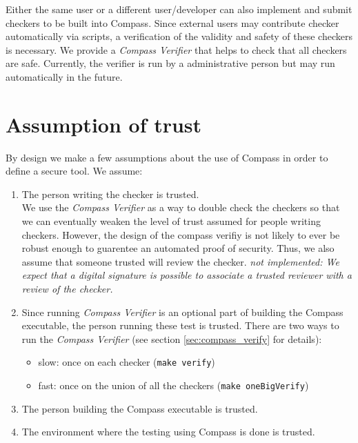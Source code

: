 Either the same user or a different user/developer can also
implement and submit checkers to be built into Compass.
Since external users may contribute checker automatically via scripts, a verification of the 
validity and safety of these checkers is necessary. We provide a \emph{Compass Verifier}
that helps to check that all checkers are safe. Currently, the verifier is run by
a administrative person but may run automatically in the future.

\section{Assumption of trust} 
By design we make a few assumptions about the use of Compass in order to define
a secure tool. We assume:
\begin{enumerate}
   \item The person writing the checker is trusted. \\
      We use the \emph{Compass Verifier} as a way to double check the 
      checkers so that we can eventually weaken the level of trust assumed for people 
      writing checkers. However, the design of the compass verifiy is not likely to
      ever be robust enough to guarentee an automated proof of security.  Thus,
      we also assume that someone trusted will review the checker.  
      {\em not implemented: We expect that a digital signature is possible to associate 
      a trusted reviewer with a review of the checker.}

   \item Since running \emph{Compass Verifier} is an optional part of building 
      the Compass executable, the person running these test is trusted. There are
      two ways to run the \emph{Compass Verifier} (see section \ref{sec:compass_verify}
    for details):
      \begin{itemize}
         \item slow: once on each checker ({\tt make verify})
         \item fast: once on the union of all the checkers ({\tt make oneBigVerify})
      \end{itemize}

   \item The person building the Compass executable is trusted.

   \item The environment where the testing using Compass is done is trusted.

\end{enumerate}

